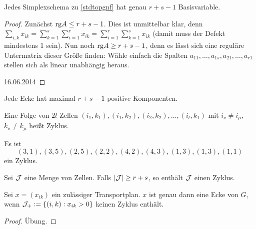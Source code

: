     \begin{theorem}
        Jedes Simplexschema zu \autoref{stdtopgnf} hat genau $r+s-1$ Basisvariable.
    \end{theorem}

    \begin{proof}
        Zunächst $\mathrm{rg} A\leq r+s-1
        $. Dies ist unmittelbar klar, denn $\sum_{i,k}{x_{ik}}=\sum_{k=1}^s\sum_{i=1}^r{x_{ik}}=\sum_{i=1}^r\sum_{k=1}^s{x_{ik}}$ (damit muss der Defekt mindestens 1 sein). Nun noch $\mathrm{rg} A\geq r+s-1$, denn es lässt sich eine reguläre Untermatrix dieser Größe finden: Wähle einfach die Spalten $a_{11},\ldots,a_{1s}, a_{21},\ldots,a_{r1}$ stellen sich als linear unabhängig heraus.

        \hfill{16.06.2014}
        
    \end{proof}

    \begin{corollary}
        Jede Ecke hat maximal $r+s-1$ positive Komponenten.
    \end{corollary}

    \begin{definition}[Zyklus]
        Eine Folge von $2l$ Zellen $(i_1,k_1),(i_1,k_2),(i_2,k_2),\ldots,(i_l,k_1)$ mit $i_\nu\neq i_\mu$, $k_\nu\neq k_\mu$ heißt Zyklus.
    \end{definition}

    \begin{example}
        Es ist
        $$
        (3,1), (3,5), (2,5), (2,2), (4,2), (4,3), (1,3), (1,3), (1,1)
        $$
        ein Zyklus.
    \end{example}

    \begin{lemma}\label{top-zyklen}
        \begin{statements}
                \item Sei $\mathcal{J}$ eine Menge von Zellen. Falls $\left\vert{\mathcal{J}}\right\vert\geq r+s$, so enthält $\mathcal{J}$ einen Zyklus.
                \item Sei $x=(x_{ik})$ ein zulässiger Transportplan. $x$ ist genau dann eine Ecke von $G$, wenn $\cJ_+:=\set{(i,k):x_{ik}>0}$ keinen Zyklus enthält.
        \end{statements}
    \end{lemma}

    \begin{proof}
        Übung.
    \end{proof}

